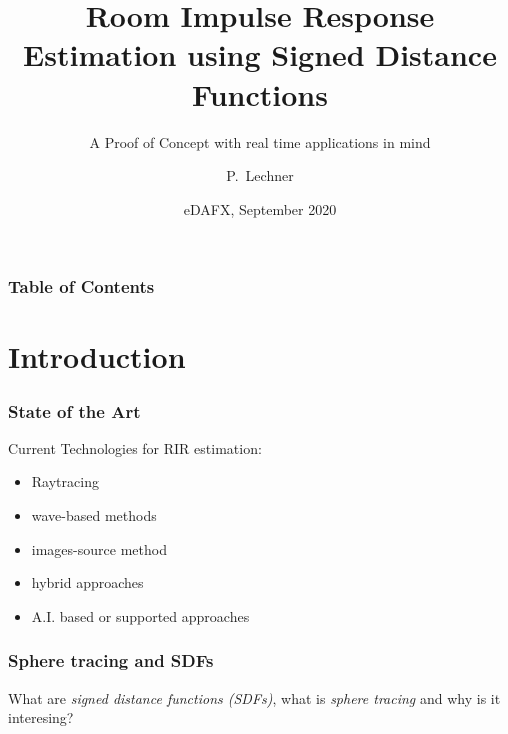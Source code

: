 \documentclass[aspectratio=169]{beamer}
\begin{document}
\title[Room Impulse Response Estimation using Signed Distance Functions] %
{Room Impulse Response Estimation using Signed Distance Functions}

\subtitle{A Proof of Concept with real time applications in mind}
\author[Patrik Lechner] %
{P.~Lechner }


\date[VLC 2013] %
{eDAFX, September 2020}





\frame{\titlepage}

\begin{frame}
\frametitle{Table of Contents}
\tableofcontents
\end{frame}


\section{Introduction}
\begin{frame}
\frametitle{State of the Art}
Current Technologies for RIR estimation:
\begin{itemize}
\item Raytracing
\item wave-based methods
\item images-source method
\item hybrid approaches
\item A.I. based or supported approaches
\end{itemize}
\end{frame}


\begin{frame}
\frametitle{Sphere tracing and SDFs}
What are \textit{signed distance functions (SDFs)}, what is \textit{sphere tracing} and why is it interesing?
\end{frame}
\end{document}
